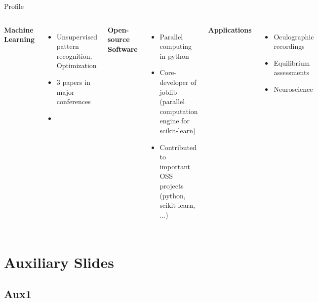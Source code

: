 \documentclass{beamer}
\begin{document}
\begin{frame}{Profile}
\begin{columns}[T]
    \textbf{Machine Learning}\\
    
    \begin{itemize}
        \item Unsupervised pattern recognition, Optimization
        \item 3 papers in major conferences
        \item 
    \end{itemize}
    \textbf{Open-source Software}
    \begin{itemize}
        \item Parallel computing in python
        \item Core-developer of joblib (parallel computation engine for scikit-learn)
        \item Contributed to important OSS projects (python, scikit-learn, ...)
    \end{itemize}
    \textbf{Applications}
    \begin{itemize}
        \item Oculographic recordings
        \item Equilibrium assessments
        \item Neuroscience
    \end{itemize}
\end{columns}
\end{frame}



\appendix
\section{Auxiliary Slides}


\subsection{Aux1}
\end{document}
